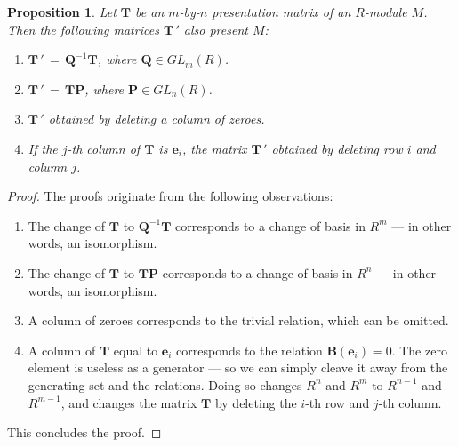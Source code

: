 \documentclass[11pt]{article}
\newtheorem{proposition}{Proposition}
\renewcommand{\vec}[1]{\mathbf{#1}}
\newcommand{\mat}[1]{\mathbf{#1}}
\begin{document}
\begin{adjustwidth}{0.5cm}{}
  \begin{proposition}
    Let $\mat{T}$ be an $m$-by-$n$ presentation matrix of an $R$-module $M$. Then the following matrices $\mat{T} \, '$ also present $M$:
    \begin{enumerate}
      \item $\mat{T}\,' \, = \, \mat{Q}^{-1}\mat{T}$, where $\mat{Q} \in GL_{m}(R)$.
      \item $\mat{T}\,' \, = \, \mat{T} \mat{P}$, where $\mat{P} \in GL_{n}(R)$.
      \item $\mat{T}\,'$ obtained by deleting a column of zeroes.
      \item If the $j$-th column of $\mat{T}$ is $\vec{e}_{i}$, the matrix $\mat{T}\,'$ obtained by deleting row $i$ and column $j$.
    \end{enumerate}
  \end{proposition}
  \begin{proof}
    The proofs originate from the following observations:
    \begin{enumerate}
      \item The change of $\mat{T}$ to $\mat{Q}^{-1}\mat{T}$ corresponds to a change of basis in $R^{m}$ --- in other words, an isomorphism.
      \item The change of $\mat{T}$ to $\mat{T}\mat{P}$ corresponds to a change of basis in $R^{n}$ --- in other words, an isomorphism.
      \newpage
      \item A column of zeroes corresponds to the trivial relation, which can be omitted.
      \item A column of $\mat{T}$ equal to $\vec{e}_{i}$ corresponds to the relation $\vec{B}(\vec{e}_{i}) = 0$. The zero element is useless as a generator --- so we can simply cleave it away from the generating set and the relations. Doing so changes $R^{n}$ and $R^{m}$ to $R^{n - 1}$ and $R^{m - 1}$, and changes the matrix $\mat{T}$ by deleting the $i$-th row and $j$-th column.
    \end{enumerate}
    This concludes the proof.
  \end{proof}
\end{adjustwidth}
\end{document}

